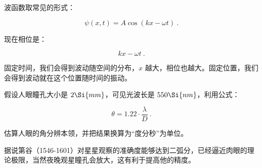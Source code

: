 波函数取常见的形式：

\begin{equation}
\psi (x,t )= A \cos \left( k x - \omega t \right)~.
\end{equation}

现在相位是：

\begin{equation}
k x - \omega t~.
\end{equation}

固定时间，我们会得到波动随空间的分布，$x$ 越大，相位也越大。固定位置，我们会得到波动就在这个位置随时间的振动。

\begin{exercise}{}
假设人眼瞳孔大小是 $2\Si{mm}$，可见光波长是 $550\Si{nm}$，利用公式：

\begin{equation}
\theta = 1.22 \cdot \frac{\lambda}{D}~.
\end{equation}

估算人眼的角分辨本领，并把结果换算为“度分秒”为单位。

据说第谷（1546-1601）对星星观察的准确度能够达到二弧分，已经逼近肉眼的理论极限，当然夜晚观星瞳孔会放大，这有利于提高他的精度。
\end{exercise}
